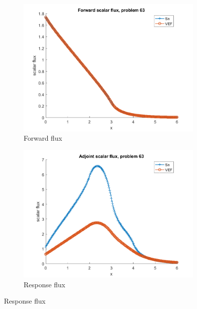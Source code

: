 \documentclass{article}
\begin{document}
\begin{figure}[H]
\label{Case63Flux}
\centering
\begin{subfigure}{.5\textwidth}
  \centering
  \includegraphics[width=.98\linewidth]{IanProposal/figures2/63phi.png}
  \caption{Forward flux}
  \label{fig:sfig1}
\end{subfigure}%
\begin{subfigure}{.5\textwidth}
  \centering
  \includegraphics[width=.98\linewidth]{IanProposal/figures2/63phia.png}
  \caption{Response flux}
  \label{fig:sfig4}
\end{subfigure}%
\end{figure}
\end{document}
